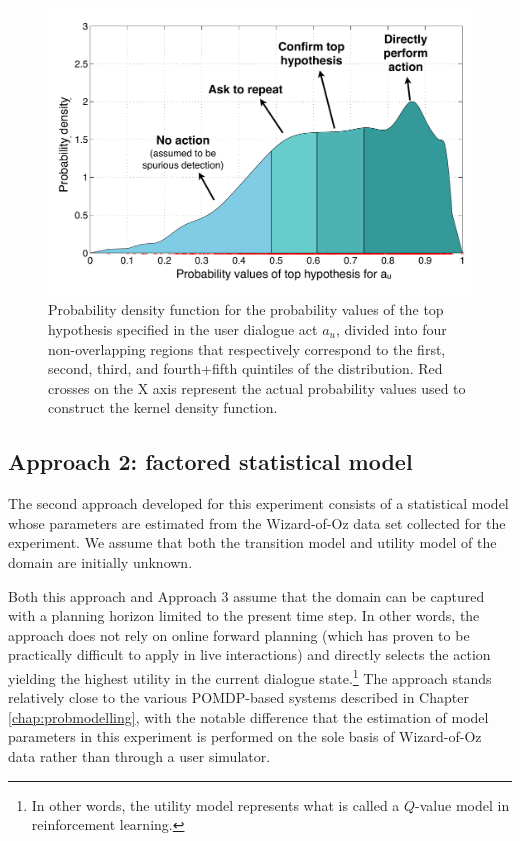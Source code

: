\begin{figure}[h!]
\centering
\includegraphics[scale=0.4]{imgs/asrconfidence.pdf} 
\caption{Probability density function for the probability values of the top hypothesis specified in the user dialogue act $a_u$, divided into four non-overlapping regions that respectively correspond to the first, second, third, and fourth+fifth quintiles of the distribution. Red crosses on the X axis represent the actual probability values used to construct the kernel density function. }
\label{fig:asrconfidence-exp3}
\end{figure}


\subsection{Approach 2: factored statistical model}
\label{sec:approach2}

The second approach developed for this experiment consists of a statistical model whose parameters are estimated from the Wizard-of-Oz data set collected for the experiment. We assume that both the transition model and utility model of the domain are initially unknown. 

Both this approach and Approach 3 assume that the domain can be captured with a planning horizon limited to the present time step.  In other words, the approach does not rely on online forward planning (which has proven to be practically difficult to apply in live interactions) and directly selects the action yielding the highest utility in the current dialogue state.\footnote{In other words, the utility model represents what is called a $Q$-value model in reinforcement learning.} The approach stands relatively close to the various POMDP-based systems described in Chapter \ref{chap:probmodelling}, with the notable difference that the estimation of model parameters in this experiment is performed on the sole basis of Wizard-of-Oz data rather than through a user simulator. 

